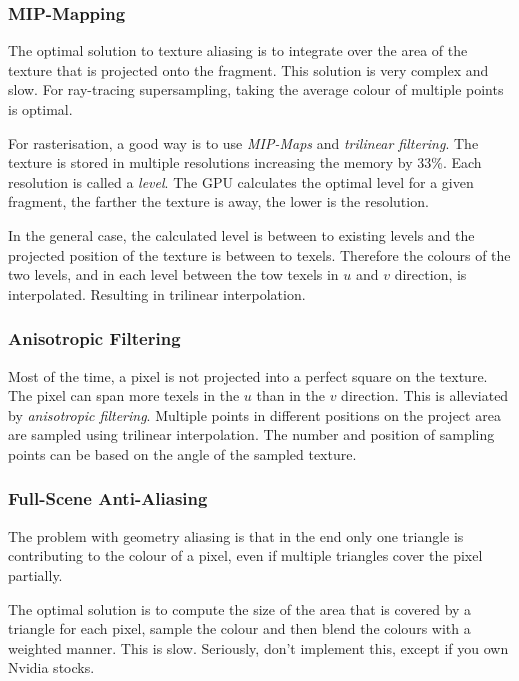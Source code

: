 \documentclass{panikzettel}
\begin{document}
\subsubsection*{MIP-Mapping}

The optimal solution to texture aliasing is to integrate over the area of the texture that is projected onto the fragment. This solution is very complex and slow. For ray-tracing supersampling, taking the average colour of multiple points is optimal.

For rasterisation, a good way is to use \emph{MIP-Maps} and \emph{trilinear filtering}. The texture is stored in multiple resolutions increasing the memory by 33\%. Each resolution is called a \emph{level}. The GPU calculates the optimal level for a given fragment, the farther the texture is away, the lower is the resolution.

In the general case, the calculated level is between to existing levels and the projected position of the texture is between to texels. Therefore the colours of the two levels, and in each level between the tow texels in $u$ and $v$ direction, is interpolated. Resulting in trilinear interpolation.

\subsubsection*{Anisotropic Filtering}

Most of the time, a pixel is not projected into a perfect square on the texture. The pixel can span more texels in the $u$ than in the $v$ direction. This is alleviated by \emph{anisotropic filtering}. Multiple points in different positions on the project area are sampled using trilinear interpolation. The number and position of sampling points can be based on the angle of the sampled texture.

\subsubsection*{Full-Scene Anti-Aliasing}

The problem with geometry aliasing is that in the end only one triangle is contributing to the colour of a pixel, even if multiple triangles cover the pixel partially.

The optimal solution is to compute the size of the area that is covered by a triangle for each pixel, sample the colour and then blend the colours with a weighted manner. This is slow. Seriously, don't implement this, except if you own Nvidia stocks.
\end{document}
